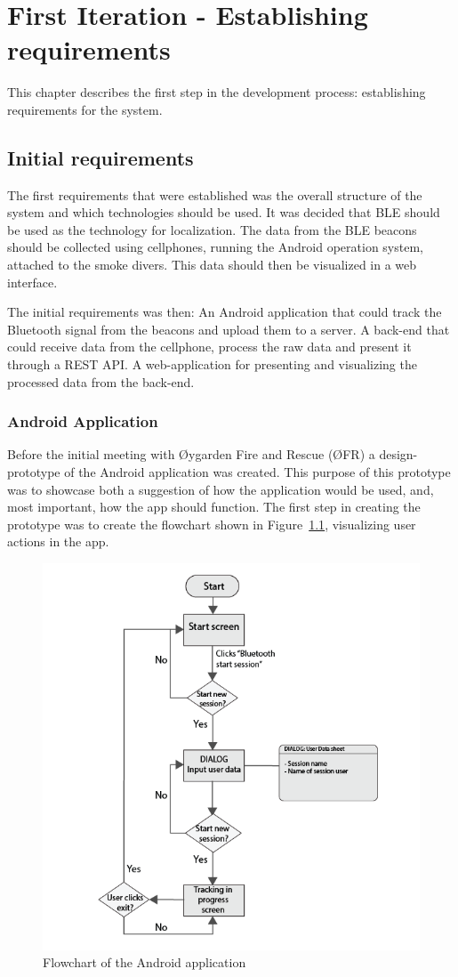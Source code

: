 \documentclass[../Main/thesis.tex]{subfiles}
\begin{document}
\chapter{First Iteration  - Establishing requirements}
\label{ch:requirements}
This chapter describes the first step in the development process: establishing requirements for the system. 

\section{Initial requirements}
The first requirements that were established was the overall structure of the system and which technologies should be used.
It was decided that BLE should be used as the technology for localization.
The data from the BLE beacons should be collected using cellphones, running the Android operation system, attached to the smoke divers.
This data should then be visualized in a web interface.

The initial requirements was then:
An Android application that could track the Bluetooth signal from the beacons and upload them to a server.
A back-end that could receive data from the cellphone, process the raw data and present it through a REST API.
A web-application for presenting and visualizing the processed data from the back-end.

\subsection{Android Application}
Before the initial meeting with Øygarden Fire and Rescue (ØFR) a design-prototype of the Android application was created. 
This purpose of this prototype was to showcase both a suggestion of how the application would be used, and, most important, how the app should function.
The first step in creating the prototype was to create the flowchart shown in Figure~\ref{fig:flow-app-1}, visualizing user actions in the app.

\begin{figure}
	\centering
	\includegraphics[width=0.6\linewidth]{../fig/flow_wire_app_1}
	\caption{Flowchart of the Android application}
	\label{fig:flow-app-1}
\end{figure}
\end{document}
